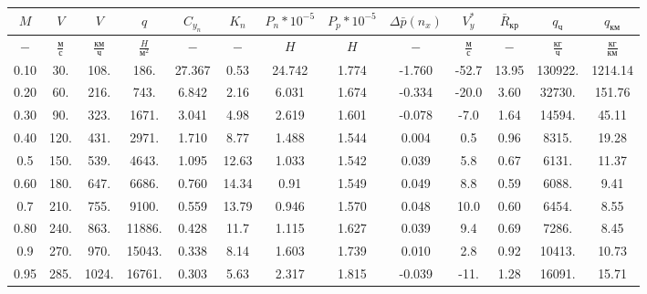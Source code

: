 \begin{tabular}{|c|c|c|c|c|c|c|c|c|c|c|c|c|}
\hline
$M$ & $V$ & $V$ & $q$ & $C_{y_n}$ & $K_n$ & $P_n*10^{-5}$ & $P_p*10^{-5}$ & $\Delta \bar{p}(n_x)$ & $V_y^*$ & $\bar{R}_{кр}$ & $q_{ч}$ & $q_{км}$ \\ 
\hline
$-$ & $\frac{м}{с}$ & $\frac{км}{ч}$ & $\frac{H}{м^2}$ & $-$ & $-$ & $H$ & $H$ & $-$ & $\frac{м}{с}$ & $-$ & $\frac{кг}{ч}$ & $\frac{кг}{км}$ \\ 
\hline
0.10 & 30. & 108. & 186. & 27.367 & 0.53 & 24.742 & 1.774 & -1.760 & -52.7 & 13.95 & 130922. & 1214.14 \\ 
\hline
0.20 & 60. & 216. & 743. & 6.842 & 2.16 & 6.031 & 1.674 & -0.334 & -20.0 & 3.60 & 32730. & 151.76 \\ 
\hline
0.30 & 90. & 323. & 1671. & 3.041 & 4.98 & 2.619 & 1.601 & -0.078 & -7.0 & 1.64 & 14594. & 45.11 \\ 
\hline
0.40 & 120. & 431. & 2971. & 1.710 & 8.77 & 1.488 & 1.544 & 0.004 & 0.5 & 0.96 & 8315. & 19.28 \\ 
\hline
0.5 & 150. & 539. & 4643. & 1.095 & 12.63 & 1.033 & 1.542 & 0.039 & 5.8 & 0.67 & 6131. & 11.37 \\ 
\hline
0.60 & 180. & 647. & 6686. & 0.760 & 14.34 & 0.91 & 1.549 & 0.049 & 8.8 & 0.59 & 6088. & 9.41 \\ 
\hline
0.7 & 210. & 755. & 9100. & 0.559 & 13.79 & 0.946 & 1.570 & 0.048 & 10.0 & 0.60 & 6454. & 8.55 \\ 
\hline
0.80 & 240. & 863. & 11886. & 0.428 & 11.7 & 1.115 & 1.627 & 0.039 & 9.4 & 0.69 & 7286. & 8.45 \\ 
\hline
0.9 & 270. & 970. & 15043. & 0.338 & 8.14 & 1.603 & 1.739 & 0.010 & 2.8 & 0.92 & 10413. & 10.73 \\ 
\hline
0.95 & 285. & 1024. & 16761. & 0.303 & 5.63 & 2.317 & 1.815 & -0.039 & -11. & 1.28 & 16091. & 15.71 \\ 
\hline
\end{tabular}